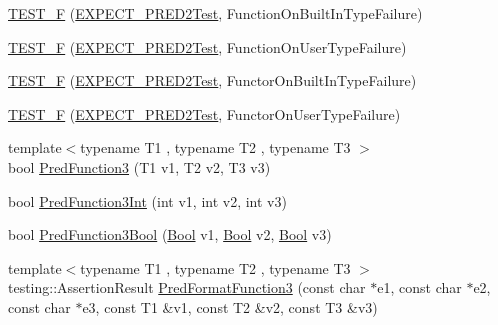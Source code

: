 \begin{DoxyCompactItemize}
\mbox{\hyperlink{_obj__test_2lib_2googletest-master_2googletest_2test_2gtest__pred__impl__unittest_8cc_ae8492c15e79d2d012460a71eb08483ed}{T\+E\+S\+T\+\_\+F}} (\mbox{\hyperlink{googletest-master_2googletest_2test_2gtest__pred__impl__unittest_8cc_a232826190f0ba7ce5dffa1ced1219acc}{E\+X\+P\+E\+C\+T\+\_\+\+P\+R\+E\+D2\+Test}}, Function\+On\+Built\+In\+Type\+Failure)
\item 
\mbox{\hyperlink{_obj__test_2lib_2googletest-master_2googletest_2test_2gtest__pred__impl__unittest_8cc_a590341b72b346a170ff6d8c73bf559b8}{T\+E\+S\+T\+\_\+F}} (\mbox{\hyperlink{googletest-master_2googletest_2test_2gtest__pred__impl__unittest_8cc_a232826190f0ba7ce5dffa1ced1219acc}{E\+X\+P\+E\+C\+T\+\_\+\+P\+R\+E\+D2\+Test}}, Function\+On\+User\+Type\+Failure)
\item 
\mbox{\hyperlink{_obj__test_2lib_2googletest-master_2googletest_2test_2gtest__pred__impl__unittest_8cc_abf5bb7d7ccccca88e88947d21091caf5}{T\+E\+S\+T\+\_\+F}} (\mbox{\hyperlink{googletest-master_2googletest_2test_2gtest__pred__impl__unittest_8cc_a232826190f0ba7ce5dffa1ced1219acc}{E\+X\+P\+E\+C\+T\+\_\+\+P\+R\+E\+D2\+Test}}, Functor\+On\+Built\+In\+Type\+Failure)
\item 
\mbox{\hyperlink{_obj__test_2lib_2googletest-master_2googletest_2test_2gtest__pred__impl__unittest_8cc_aab4f3bf01d55a7228147db3c959fd830}{T\+E\+S\+T\+\_\+F}} (\mbox{\hyperlink{googletest-master_2googletest_2test_2gtest__pred__impl__unittest_8cc_a232826190f0ba7ce5dffa1ced1219acc}{E\+X\+P\+E\+C\+T\+\_\+\+P\+R\+E\+D2\+Test}}, Functor\+On\+User\+Type\+Failure)
\item 
{\footnotesize template$<$typename T1 , typename T2 , typename T3 $>$ }\\bool \mbox{\hyperlink{_obj__test_2lib_2googletest-master_2googletest_2test_2gtest__pred__impl__unittest_8cc_a78a1ff258fe5a85da5b2645983311a70}{Pred\+Function3}} (T1 v1, T2 v2, T3 v3)
\item 
bool \mbox{\hyperlink{_obj__test_2lib_2googletest-master_2googletest_2test_2gtest__pred__impl__unittest_8cc_a31b4c93e469feb1523b6073634c1ca4c}{Pred\+Function3\+Int}} (int v1, int v2, int v3)
\item 
bool \mbox{\hyperlink{_obj__test_2lib_2googletest-master_2googletest_2test_2gtest__pred__impl__unittest_8cc_afa4ce2143c2ffedb2fa5d5f8cff6f6e6}{Pred\+Function3\+Bool}} (\mbox{\hyperlink{struct_bool}{Bool}} v1, \mbox{\hyperlink{struct_bool}{Bool}} v2, \mbox{\hyperlink{struct_bool}{Bool}} v3)
\item 
{\footnotesize template$<$typename T1 , typename T2 , typename T3 $>$ }\\testing\+::\+Assertion\+Result \mbox{\hyperlink{_obj__test_2lib_2googletest-master_2googletest_2test_2gtest__pred__impl__unittest_8cc_abddc62e1faf4d19992a0acb69577e0f3}{Pred\+Format\+Function3}} (const char $\ast$e1, const char $\ast$e2, const char $\ast$e3, const T1 \&v1, const T2 \&v2, const T3 \&v3)

\end{DoxyCompactItemize}
